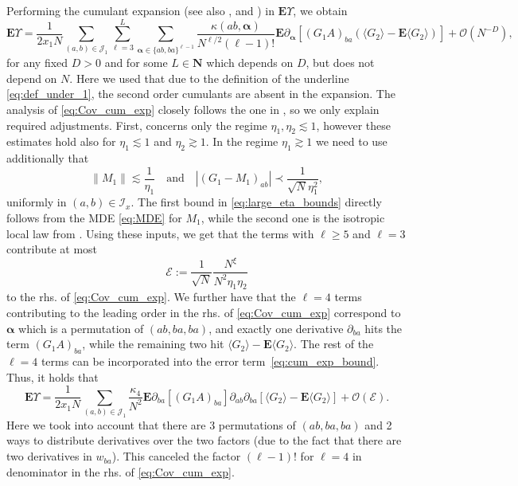 \documentclass[10pt]{amsart}
\numberwithin{equation}{section}
\newcommand{\E}{\mathbf{E}}
\newcommand{\N}{\mathbf{N}}
\begin{document}
Performing the cumulant expansion \cite[Lemma~3.2]{Knowles20} (see also \cite[Eq.(7.14)]{hyperuniformity}, \cite[Lemma~3.1]{HeKnowles} and \cite[Section~II]{Khorunzhy96}) in $\E \Upsilon$, we obtain
\begin{equation}
\E\Upsilon = \frac{1}{2x_1N}\sum_{(a,b)\in\mathcal{J}_1}\sum_{\ell=3}^L\sum_{\bm{\alpha}\in\{ab,ba\}^{\ell-1}}\frac{\kappa(ab,\bm{\alpha})}{N^{\ell/2}(\ell-1)!}\E\partial_{\bm{\alpha}}\left[ \left(G_1A\right)_{ba}\left(\langle G_2\rangle - \E\langle G_2\rangle\right)\right] + \mathcal{O}(N^{-D}),
\label{eq:Cov_cum_exp}
\end{equation}
for any fixed $D>0$ and for some $L\in\N$ which depends on $D$, but does not depend on $N$. Here we used that due to the definition of the underline \eqref{eq:def_under_1}, the second order cumulants are absent in the expansion. The analysis of \eqref{eq:Cov_cum_exp} closely follows the one in \cite[Eq.(7.14)-(7.24)]{hyperuniformity}, so we only explain required adjustments. First, \cite[Eq.(7.14)-(7.24)]{hyperuniformity} concerns only the regime $\eta_1,\eta_2\lesssim 1$, however these estimates hold also for $\eta_1\lesssim 1$ and $\eta_2\gtrsim 1$. In the regime $\eta_1\gtrsim 1$ we need to use additionally that
\begin{equation}
\|M_1\|\lesssim \frac{1}{\eta_1}\quad\text{and}\quad \left\vert(G_1-M_1)_{ab}\right\vert\prec\frac{1}{\sqrt{N}\eta_1^2},
\label{eq:large_eta_bounds}
\end{equation}
uniformly in $(a,b)\in\mathcal{I}_x$. The first bound in \eqref{eq:large_eta_bounds} directly follows from the MDE \eqref{eq:MDE} for $M_1$, while the second one is the isotropic local law from \cite[Eq.(5.2)]{loc_circ_law18}. Using these inputs, we get that the terms with $\ell\ge 5$ and $\ell=3$ contribute at most 
\begin{equation}
\mathcal{E}:=\frac{1}{\sqrt{N}}\frac{N^\xi}{N^2\eta_1\eta_2}
\label{eq:cum_exp_bound}
\end{equation}
to the rhs. of \eqref{eq:Cov_cum_exp}. We further have that the $\ell=4$ terms contributing to the leading order in the rhs. of \eqref{eq:Cov_cum_exp} correspond to $\bm{\alpha}$ which is a permutation of $(ab,ba,ba)$, and exactly one derivative $\partial_{ba}$ hits the term $(G_1A)_{ba}$, while the remaining two hit $\langle G_2\rangle-\E\langle G_2\rangle$. The rest of the $\ell=4$ terms can be incorporated into the error term~\eqref{eq:cum_exp_bound}. Thus, it holds that
\begin{equation}
\E\Upsilon =\frac{1}{2x_1N}\sum_{(a,b)\in\mathcal{J}_1} \frac{\kappa_4}{N^2} \E \partial_{ba} [(G_1A)_{ba}]\partial_{ab}\partial_{ba} \left[ \langle G_2\rangle -\E\langle G_2\rangle\right] +\mathcal{O}\left(\mathcal{E}\right).
\label{eq:cum_exp_kappa4}
\end{equation}
Here we took into account that there are 3 permutations of $(ab,ba,ba)$ and 2 ways to distribute derivatives over the two factors (due to the fact that there are two derivatives in $w_{ba}$). This canceled the factor $(\ell-1)!$ for $\ell=4$ in denominator in the rhs. of \eqref{eq:Cov_cum_exp}.
\end{document}
